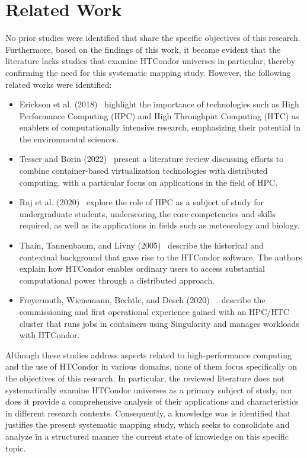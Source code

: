\section{Related Work}\label{sec:trabajos-relacionados}
No prior studies were identified that share the specific objectives of this research. Furthermore, based on the findings of this work, it became evident that the literature lacks studies that examine HTCondor universes in particular, thereby confirming the need for this systematic mapping study.
However, the following related works were identified:
\begin{itemize}
	\item Erickson et al. (2018)~\cite{EricksonA-01} highlight the importance of technologies such as High Performance Computing (HPC) and High Throughput Computing (HTC) as enablers of computationally intensive research, emphasizing their potential in the environmental sciences.
	\item Tesser and Borin (2022)~\cite{KellerTesser2023} present a literature review discussing efforts to combine container-based virtualization technologies with distributed computing, with a particular focus on applications in the field of HPC.
	\item Raj et al. (2020)~\cite{RajRomanowski2020} explore the role of HPC as a subject of study for undergraduate students, underscoring the core competencies and skills required, as well as its applications in fields such as meteorology and biology.
	\item Thain, Tannenbaum, and Livny (2005)~\cite{Livny-Tannenbaum2005} describe the historical and contextual background that gave rise to the HTCondor software. The authors explain how HTCondor enables ordinary users to access substantial computational power through a distributed approach.
	\item Freyermuth, Wienemann, Bechtle, and Desch (2020) ~\cite{Freyermuth2021a}. describe the commissioning and first operational experience gained with an HPC/HTC cluster that runs jobs in containers using Singularity and manages workloads with HTCondor.
\end{itemize}

Although these studies address aspects related to high-performance computing and the use of HTCondor in various domains, none of them focus specifically on the objectives of this research. In particular, the reviewed literature does not systematically examine HTCondor universes as a primary subject of study, nor does it provide a comprehensive analysis of their applications and characteristics in different research contexts. Consequently, a knowledge was is identified that justifies the present systematic mapping study, which seeks to consolidate and analyze in a structured manner the current state of knowledge on this specific topic.


